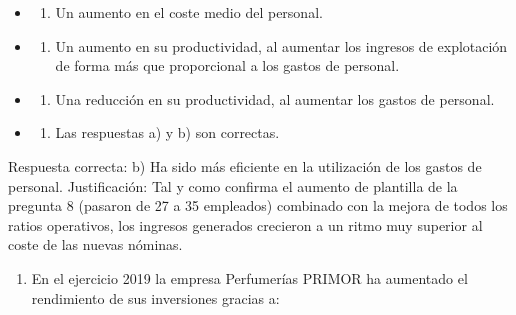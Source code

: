 \documentclass[12pt]{book} %
\providecommand{\tightlist}{%
  \setlength{\itemsep}{0pt}\setlength{\parskip}{0pt}}
\begin{document}
\begin{itemize}
\item
  \begin{enumerate}
  \def\labelenumi{\alph{enumi})}
  \tightlist
  \item
    Un aumento en el coste medio del personal.
  \end{enumerate}
\item
  \begin{enumerate}
  \def\labelenumi{\alph{enumi})}
  \setcounter{enumi}{1}
  \tightlist
  \item
    Un aumento en su productividad, al aumentar los ingresos de
    explotación de forma más que proporcional a los gastos de personal.
  \end{enumerate}
\item
  \begin{enumerate}
  \def\labelenumi{\alph{enumi})}
  \setcounter{enumi}{2}
  \tightlist
  \item
    Una reducción en su productividad, al aumentar los gastos de
    personal.
  \end{enumerate}
\item
  \begin{enumerate}
  \def\labelenumi{\alph{enumi})}
  \setcounter{enumi}{3}
  \tightlist
  \item
    Las respuestas a) y b) son correctas.
  \end{enumerate}
\end{itemize}

Respuesta correcta: b) Ha sido más eficiente en la utilización de los
gastos de personal. Justificación: Tal y como confirma el aumento de
plantilla de la pregunta 8 (pasaron de 27 a 35 empleados) combinado con
la mejora de todos los ratios operativos, los ingresos generados
crecieron a un ritmo muy superior al coste de las nuevas nóminas.

\begin{enumerate}
\def\labelenumi{\arabic{enumi}.}
\setcounter{enumi}{8}
\tightlist
\item
  En el ejercicio 2019 la empresa Perfumerías PRIMOR ha aumentado el
  rendimiento de sus inversiones gracias a:
\end{enumerate}
\end{document}
